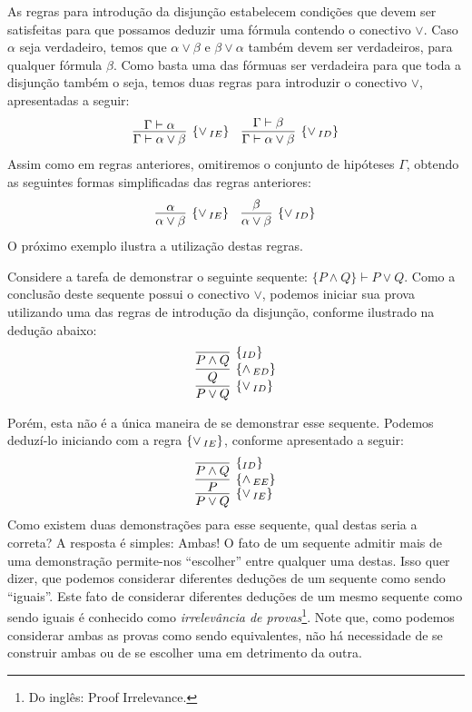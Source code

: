 As regras para introdu\c{c}\~ao da disjun\c{c}\~ao estabelecem
condi\c{c}\~oes que devem ser satisfeitas para que possamos deduzir
uma f\'ormula contendo o conectivo $\lor$. Caso $\alpha$ seja
verdadeiro, temos que  $\alpha \lor \beta$ e $\beta\lor \alpha$
tamb\'em devem ser verdadeiros, para qualquer f\'ormula $\beta$.
Como basta uma das f\'ormuas ser verdadeira para que toda a
disjun\c{c}\~ao tamb\'em o seja, temos duas regras para introduzir o
conectivo $\lor$, apresentadas a seguir:
\[
\begin{array}{cc}
    \infer[\orIE]{\Gamma \vdash \alpha \lor \beta}
                      {\Gamma \vdash \alpha}
    &
    \infer[\orID]{\Gamma \vdash \alpha \lor \beta}
                      {\Gamma \vdash \beta}
\end{array}
\]
Assim como em regras anteriores, omitiremos o conjunto de hip\'oteses
$\Gamma$, obtendo as seguintes formas simplificadas das regras anteriores:
\[
\begin{array}{cc}
    \infer[\orIE]{\alpha \lor \beta}
                      {\alpha}
    &
    \infer[\orID]{\alpha \lor \beta}
                      {\beta}
\end{array}
\]
O pr\'oximo exemplo ilustra a utiliza\c{c}\~ao destas regras.
\begin{Example}
Considere a tarefa de demonstrar o seguinte sequente: $\{P \land Q\}
\vdash P \lor Q$. Como a conclus\~ao deste sequente possui o conectivo
$\lor$, podemos iniciar sua prova utilizando uma das regras de
introdu\c{c}\~ao da disjun\c{c}\~ao, conforme ilustrado na
dedu\c{c}\~ao abaixo:
\[
     \infer[\orID]{P \lor Q}
                        {
                          \infer[\andED]{Q}
                                                {
                                                  \infer[\Id]{P\land Q}{}
                                                }
                        }
\]
\end{Example}
Por\'em, esta n\~ao \'e a \'unica maneira de se demonstrar esse
sequente. Podemos deduz\'i-lo iniciando com a regra $\scriptsize{\{\lor\,_{IE}\}}$, conforme
apresentado a seguir:
\[
     \infer[\orIE]{P \lor Q}
                        {
                          \infer[\andEE]{P}
                                                {
                                                  \infer[\Id]{P\land Q}{}
                                                }
                        }
\]
Como existem duas demonstra\c{c}\~oes para esse sequente, qual destas
seria a correta? A resposta \'e simples: Ambas! O fato de um sequente
admitir mais de uma demonstra\c{c}\~ao permite-nos ``escolher'' entre
qualquer uma destas. Isso quer dizer, que podemos considerar
diferentes dedu\c{c}\~oes de um sequente como sendo ``iguais''. Este
fato de considerar diferentes dedu\c{c}\~oes de um mesmo sequente como
sendo iguais \'e conhecido como \textit{irrelev\^ancia de
  provas}\footnote{Do ingl\^es: Proof Irrelevance.}.  Note que, como
podemos considerar ambas as provas como sendo equivalentes, n\~ao h\'a
necessidade de se construir ambas ou de se escolher uma em detrimento
da outra.


